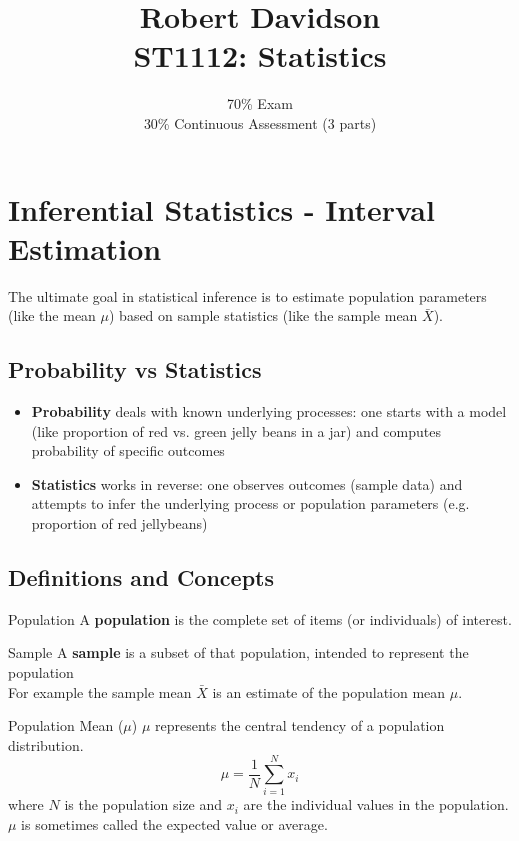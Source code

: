 \documentclass[9pt]{extarticle}
\title{
Robert Davidson \\
\textbf{ST1112: Statistics}
}
\author{
70\% Exam\\
30\% Continuous Assessment (3 parts)
}
\date{}       %
\begin{document}
\maketitle
\pagebreak

\tableofcontents
\pagebreak

\section{Inferential Statistics - Interval Estimation}
The ultimate goal in statistical inference is to estimate population parameters (like the mean $\mu$) based on sample statistics (like the sample mean $\bar{X}$).
\subsection{Probability vs Statistics}
\begin{itemize}
    \item \textbf{Probability} deals with known underlying processes: one starts with a model (like proportion of red vs. green jelly beans in a jar) and computes probability of specific outcomes
    \item \textbf{Statistics} works in reverse: one observes outcomes (sample data) and attempts to infer the underlying process or population parameters (e.g. proportion of red jellybeans)
\end{itemize}
\subsection{Definitions and Concepts}

\begin{definitionbox}{Population}{}
    A \textbf{population} is the complete set of items (or individuals) of interest.
\end{definitionbox}

\begin{definitionbox}{Sample}{}
    A \textbf{sample} is a subset of that population, intended to represent the population\\

    For example the sample mean $\bar{X}$ is an estimate of the population mean $\mu$.
\end{definitionbox}

\begin{definitionbox}{Population Mean ($\mu$)}{}
    $\mu$ represents the central tendency of a population distribution.
    $$\mu = \frac{1}{N} \sum_{i=1}^{N} x_i$$
    where $N$ is the population size and $x_i$ are the individual values in the population.\\

    $\mu$ is sometimes called the expected value or average.
\end{definitionbox}
\end{document}
